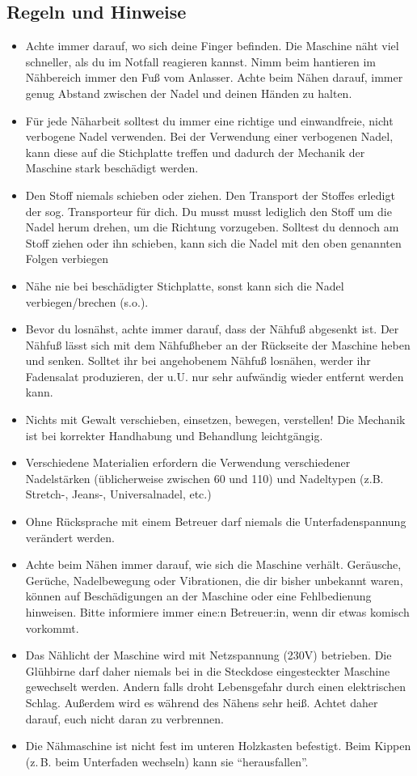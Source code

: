 \documentclass{\basedir/fablab-document}
\begin{document}
\pagebreak

\subsection{Regeln und Hinweise}
\begin{itemize}
	\item Achte immer darauf, wo sich deine Finger befinden. Die Maschine näht viel schneller, als du im Notfall reagieren kannst. Nimm beim hantieren im Nähbereich immer den Fuß vom Anlasser. Achte beim Nähen darauf, immer genug Abstand zwischen der Nadel und deinen Händen zu halten.
	\item Für jede Näharbeit solltest du immer eine richtige und einwandfreie, nicht verbogene Nadel verwenden. Bei der Verwendung einer verbogenen Nadel, kann diese auf die Stichplatte treffen und dadurch der Mechanik der Maschine stark beschädigt werden.
	\item Den Stoff niemals schieben oder ziehen. Den Transport der Stoffes erledigt der sog. Transporteur für dich. Du musst musst lediglich den Stoff um die Nadel herum drehen, um die Richtung vorzugeben. Solltest du dennoch am Stoff ziehen oder ihn schieben, kann sich die Nadel mit den oben genannten Folgen verbiegen
	\item Nähe nie bei beschädigter Stichplatte, sonst kann sich die Nadel verbiegen/brechen (s.o.).
	\item Bevor du losnähst, achte immer darauf, dass der Nähfuß abgesenkt ist. Der Nähfuß lässt sich mit dem Nähfußheber an der Rückseite der Maschine heben und senken. Solltet ihr bei angehobenem Nähfuß losnähen, werder ihr Fadensalat produzieren, der u.U. nur sehr aufwändig wieder entfernt werden kann.
	\item Nichts mit Gewalt verschieben, einsetzen, bewegen, verstellen! Die Mechanik ist bei korrekter Handhabung und Behandlung leichtgängig.
	\item Verschiedene Materialien erfordern die Verwendung verschiedener Nadelstärken (üblicherweise zwischen 60 und 110) und Nadeltypen (z.B. Stretch-, Jeans-,  Universalnadel, etc.)
	\item Ohne Rücksprache mit einem Betreuer darf niemals die Unterfadenspannung verändert werden.
	\item Achte beim Nähen immer darauf, wie sich die Maschine verhält. Geräusche, Gerüche, Nadelbewegung oder Vibrationen, die dir bisher unbekannt waren, können auf Beschädigungen an der Maschine oder eine Fehlbedienung hinweisen. Bitte informiere immer eine:n Betreuer:in, wenn dir etwas komisch vorkommt.
	\item Das Nählicht der Maschine wird mit Netzspannung (230V) betrieben. Die Glühbirne darf daher niemals bei in die Steckdose eingesteckter Maschine gewechselt werden. Andern falls droht Lebensgefahr durch einen elektrischen Schlag. Außerdem wird es während des Nähens sehr heiß. Achtet daher darauf, euch nicht daran zu verbrennen.
	\item Die Nähmaschine ist nicht fest im unteren Holzkasten befestigt. Beim Kippen (z.\,B. beim Unterfaden wechseln) kann sie \enquote{herausfallen}.
\end{itemize}
\end{document}
